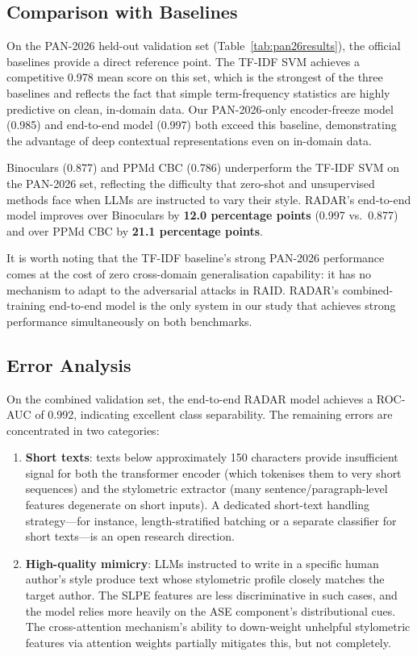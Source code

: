 \documentclass[]{ceurart}
\begin{document}
\subsection{Comparison with Baselines}

On the PAN-2026 held-out validation set (Table~\ref{tab:pan26results}), the official baselines provide a direct reference point. The TF-IDF SVM achieves a competitive 0.978 mean score on this set, which is the strongest of the three baselines and reflects the fact that simple term-frequency statistics are highly predictive on clean, in-domain data. Our PAN-2026-only encoder-freeze model (0.985) and end-to-end model (0.997) both exceed this baseline, demonstrating the advantage of deep contextual representations even on in-domain data.

Binoculars (0.877) and PPMd CBC (0.786) underperform the TF-IDF SVM on the PAN-2026 set, reflecting the difficulty that zero-shot and unsupervised methods face when LLMs are instructed to vary their style. RADAR's end-to-end model improves over Binoculars by \textbf{12.0 percentage points} (0.997 vs.\ 0.877) and over PPMd CBC by \textbf{21.1 percentage points}.

It is worth noting that the TF-IDF baseline's strong PAN-2026 performance comes at the cost of zero cross-domain generalisation capability: it has no mechanism to adapt to the adversarial attacks in RAID. RADAR's combined-training end-to-end model is the only system in our study that achieves strong performance simultaneously on both benchmarks.

\subsection{Error Analysis}

On the combined validation set, the end-to-end RADAR model achieves a ROC-AUC of 0.992, indicating excellent class separability. The remaining errors are concentrated in two categories:

\begin{enumerate}
  \item \textbf{Short texts}: texts below approximately 150 characters provide insufficient signal for both the transformer encoder (which tokenises them to very short sequences) and the stylometric extractor (many sentence/paragraph-level features degenerate on short inputs). A dedicated short-text handling strategy—for instance, length-stratified batching or a separate classifier for short texts—is an open research direction.
  \item \textbf{High-quality mimicry}: LLMs instructed to write in a specific human author's style produce text whose stylometric profile closely matches the target author. The SLPE features are less discriminative in such cases, and the model relies more heavily on the ASE component's distributional cues. The cross-attention mechanism's ability to down-weight unhelpful stylometric features via attention weights partially mitigates this, but not completely.
\end{enumerate}
\end{document}
